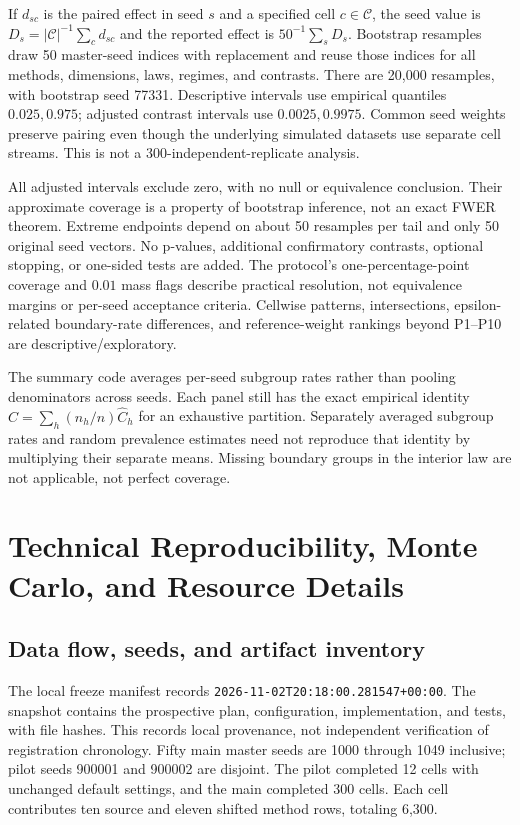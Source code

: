 \documentclass{article}
\theoremstyle{plain}
\begin{document}
If $d_{sc}$ is the paired effect in seed $s$ and a specified cell $c\in\mathcal C$, the seed value is $D_s=|\mathcal C|^{-1}\sum_cd_{sc}$ and the reported effect is $50^{-1}\sum_sD_s$. Bootstrap resamples draw 50 master-seed indices with replacement and reuse those indices for all methods, dimensions, laws, regimes, and contrasts. There are 20,000 resamples, with bootstrap seed 77331. Descriptive intervals use empirical quantiles $0.025,0.975$; adjusted contrast intervals use $0.0025,0.9975$. Common seed weights preserve pairing even though the underlying simulated datasets use separate cell streams. This is not a 300-independent-replicate analysis.

All adjusted intervals exclude zero, with no null or equivalence conclusion. Their approximate coverage is a property of bootstrap inference, not an exact FWER theorem. Extreme endpoints depend on about 50 resamples per tail and only 50 original seed vectors. No p-values, additional confirmatory contrasts, optional stopping, or one-sided tests are added. The protocol's one-percentage-point coverage and $0.01$ mass flags describe practical resolution, not equivalence margins or per-seed acceptance criteria. Cellwise patterns, intersections, epsilon-related boundary-rate differences, and reference-weight rankings beyond P1--P10 are descriptive/exploratory.

The summary code averages per-seed subgroup rates rather than pooling denominators across seeds. Each panel still has the exact empirical identity $\widehat C=\sum_h(n_h/n)\widehat C_h$ for an exhaustive partition. Separately averaged subgroup rates and random prevalence estimates need not reproduce that identity by multiplying their separate means. Missing boundary groups in the interior law are not applicable, not perfect coverage.

\section{Technical Reproducibility, Monte Carlo, and Resource Details}
\label{app:technical}
\subsection{Data flow, seeds, and artifact inventory}
The local freeze manifest records \texttt{2026-11-02T20:18:00.281547+00:00}. The snapshot contains the prospective plan, configuration, implementation, and tests, with file hashes. This records local provenance, not independent verification of registration chronology. Fifty main master seeds are 1000 through 1049 inclusive; pilot seeds 900001 and 900002 are disjoint. The pilot completed 12 cells with unchanged default settings, and the main completed 300 cells. Each cell contributes ten source and eleven shifted method rows, totaling 6,300.
\end{document}
